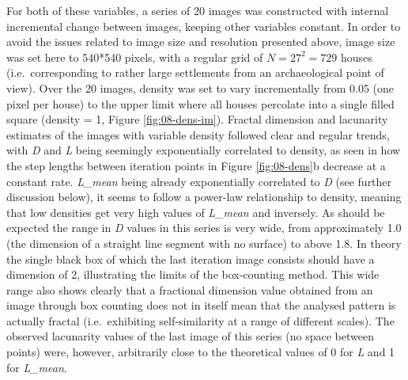 \documentclass[
  12pt,
  a4paper, twoside]{book}
\begin{document}
For both of these variables, a series of 20 images was constructed with internal incremental change between images, keeping other variables constant. In order to avoid the issues related to image size and resolution presented above, image size was set here to 540*540 pixels, with a regular grid of \(N = 27^2 = 729\) houses (i.e.~corresponding to rather large settlements from an archaeological point of view). Over the 20 images, density was set to vary incrementally from 0.05 (one pixel per house) to the upper limit where all houses percolate into a single filled square (density = 1, Figure \ref{fig:08-dens-im}). Fractal dimension and lacunarity estimates of the images with variable density followed clear and regular trends, with \emph{D} and \emph{L} being seemingly exponentially correlated to density, as seen in how the step lengths between iteration points in Figure \ref{fig:08-dens}b decrease at a constant rate. \emph{L\_mean} being already exponentially correlated to \emph{D} (see further discussion below), it seems to follow a power-law relationship to density, meaning that low densities get very high values of \emph{L\_mean} and inversely. As should be expected the range in \emph{D} values in this series is very wide, from approximately 1.0 (the dimension of a straight line segment with no surface) to above 1.8. In theory the single black box of which the last iteration image consists should have a dimension of 2, illustrating the limits of the box-counting method. This wide range also shows clearly that a fractional dimension value obtained from an image through box counting does not in itself mean that the analysed pattern is actually fractal (i.e.~exhibiting self-similarity at a range of different scales). The observed lacunarity values of the last image of this series (no space between points) were, however, arbitrarily close to the theoretical values of 0 for \emph{L} and 1 for \emph{L\_mean}.
\end{document}
